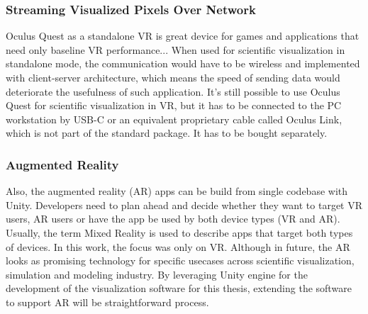 \subsubsection{Streaming Visualized Pixels Over Network}

Oculus Quest as a standalone VR is great device for games and applications that need only baseline VR performance... When used for scientific visualization in standalone mode, the communication would have to be wireless and implemented with client-server architecture, which means the speed of sending data would deteriorate the usefulness of such application. It's still possible to use Oculus Quest for scientific visualization in VR, but it has to be connected to the PC workstation by USB-C or an equivalent proprietary cable called Oculus Link, which is not part of the standard package. It has to be bought separately.

\subsubsection{Augmented Reality}\label{sec:future-ar}

Also, the augmented reality (AR) apps can be build from single codebase with Unity. Developers need to plan ahead and decide whether they want to target VR users, AR users or have the app be used by both device types (VR and AR). Usually, the term Mixed Reality is used to describe apps that target both types of devices. In this work, the focus was only on VR. Although in future, the AR looks as promising technology for specific usecases across scientific visualization, simulation and modeling industry. By leveraging Unity engine for the development of the visualization software for  this thesis, extending the software to support AR will be straightforward process.




